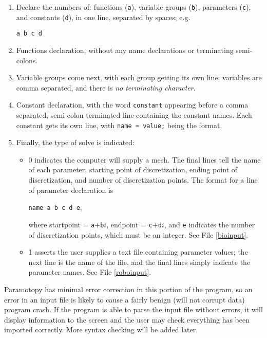 \begin{enumerate} 
\item Declare the numbers of: functions (\texttt{a}), variable groups (\texttt{b}), parameters (\texttt{c}), and constants (\texttt{d}), in one line, separated by spaces; e.g. \begin{center} \texttt{a b c d} \end{center}
\item Functions declaration, without any name declarations or terminating semi-colons.  
\item Variable groups come next, with each group getting its own line; variables are comma separated, and there is \emph{no terminating character}.  
\item Constant declaration,  with the word \texttt{constant} appearing before a comma separated, semi-colon terminated line containing the constant names.  Each constant gets its own line, with \texttt{name = value;} being the format.  
\item Finally, the type of solve is indicated: 
\begin{itemize} 

	\item 0 indicates the computer will supply a mesh.  The final lines tell the name of each parameter, starting point of discretization, ending point of discretization, and number of discretization points.  The format for a line of parameter declaration is \begin{center} \texttt{name  a  b  c  d  e}, \end{center} where startpoint = \texttt{a}$+$\texttt{b}$i$, endpoint = \texttt{c}$+$\texttt{d}$i$, and \texttt{e} indicates the number of discretization points, which must be an integer. See File \ref{bioinput}.

	
	\item 1 asserts the user supplies a text file containing parameter values; the next line is the name of the file, and the final lines simply indicate the parameter names.  See File \ref{roboinput}.
		\end{itemize}
\end{enumerate}



Paramotopy has minimal error correction in this portion of the program, so an error in an input file is likely to cause a fairly benign (will not corrupt data) program crash.  If the program is able to parse the input file without errors, it will display information to the screen and the user may check everything has been imported correctly.  More syntax checking will be added later.




